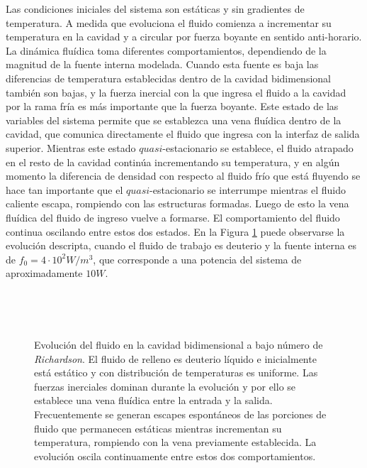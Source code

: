 Las condiciones iniciales del sistema son estáticas y sin gradientes de temperatura.
A medida que evoluciona el fluido comienza a incrementar su temperatura en la cavidad y a circular por fuerza boyante en sentido anti-horario.
La dinámica fluídica toma diferentes comportamientos, dependiendo de la magnitud de la fuente interna modelada.
Cuando esta fuente es baja las diferencias de temperatura establecidas dentro de la cavidad bidimensional también son bajas,
y la fuerza inercial con la que ingresa el fluido a la cavidad por la rama fría es más importante que la fuerza boyante.
Este estado de las variables del sistema permite que se establezca una vena fluídica dentro de la cavidad, que comunica directamente el fluido que ingresa con la interfaz de salida superior.
Mientras este estado $quasi$-estacionario se establece, el fluido atrapado en el resto de la cavidad continúa incrementando su temperatura,
y en algún momento la diferencia de densidad con respecto al fluido frío que está fluyendo se hace tan importante
que el $quasi$-estacionario se interrumpe mientras el fluido caliente escapa, rompiendo con las estructuras formadas.
Luego de esto la vena fluídica del fluido de ingreso vuelve a formarse.
El comportamiento del fluido continua oscilando entre estos dos estados.
En la Figura \ref{evol-10w} puede observarse la evolución descripta, cuando el fluido de trabajo es deuterio y la fuente interna es de $f_0=4\cdot10^2W/m^3$,
que corresponde a una potencia del sistema de aproximadamente $10W$.

\begin{figure}[ht]
\begin{minipage}{.5\linewidth}
\centering
{}\\
\end{minipage}\hfill
\begin{minipage}{.5\linewidth}
\centering
{}\\
\end{minipage}
\caption[Evolución del fluido en la cavidad bidimensional a bajo Richardson]
{Evolución del fluido en la cavidad bidimensional a bajo número de \textit{Richardson}.
 El fluido de relleno es deuterio líquido e inicialmente está estático y con distribución de temperaturas es uniforme.
 Las fuerzas inerciales dominan durante la evolución y por ello se establece una vena fluídica entre la entrada y la salida.
 Frecuentemente se generan escapes espontáneos de las porciones de fluido que permanecen estáticas mientras incrementan su temperatura, rompiendo con la vena previamente establecida.
 La evolución oscila continuamente entre estos dos comportamientos.}
\label{evol-10w}
\end{figure}

